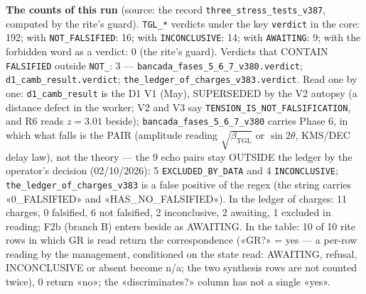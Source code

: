 \documentclass[11pt]{article}
\newcommand{\bTGL}{\beta_{\mathrm{TGL}}}\newcommand{\Msun}{M_{\odot}}\newcommand{\TGL}{\mathrm{TGL}}
\theoremstyle{definition}\newtheorem{deriv}{Derivation}
\begin{document}
\textbf{The counts of this run} (source: the record \texttt{three\_stress\_tests\_v387}, computed by the rite's guard). \texttt{TGL\_*} verdicts under the key \texttt{verdict} in the core: 192; with \texttt{NOT\_FALSIFIED}: 16; with \texttt{INCONCLUSIVE}: 14; with \texttt{AWAITING}: 9; with the forbidden word as a verdict: 0 (the rite's guard). Verdicts that CONTAIN \texttt{FALSIFIED} outside \texttt{NOT\_}: 3 --- \texttt{bancada\_fases\_5\_6\_7\_v380.verdict}; \texttt{d1\_camb\_result.verdict}; \texttt{the\_ledger\_of\_charges\_v383.verdict}. Read one by one: \texttt{d1\_camb\_result} is the D1 V1 (May), SUPERSEDED by the V2 autopsy (a distance defect in the worker; V2 and V3 say \texttt{TENSION\_IS\_NOT\_FALSIFICATION}, and R6 reads $z=3.01$ beside); \texttt{bancada\_fases\_5\_6\_7\_v380} carries Phase 6, in which what falls is the PAIR (amplitude reading $\sqrt{\bTGL}$ or $\sin2\theta$, KMS/DEC delay law), not the theory --- the 9 echo pairs stay OUTSIDE the ledger by the operator's decision (02/10/2026): 5 \texttt{EXCLUDED\_BY\_DATA} and 4 \texttt{INCONCLUSIVE}; \texttt{the\_ledger\_of\_charges\_v383} is a false positive of the regex (the string carries «0\_FALSIFIED» and «HAS\_NO\_FALSIFIED»). In the ledger of charges: 11 charges, 0 falsified, 6 not falsified, 2 inconclusive, 2 awaiting, 1 excluded in reading; F2b (branch B) enters beside as AWAITING. In the table: 10 of 10 rite rows in which GR is read return the correspondence («GR?» = yes --- a per-row reading by the management, conditioned on the state read: AWAITING, refusal, INCONCLUSIVE or absent become n/a; the two synthesis rows are not counted twice), 0 return «no»; the «discriminates?» column has not a single «yes».
\end{document}
